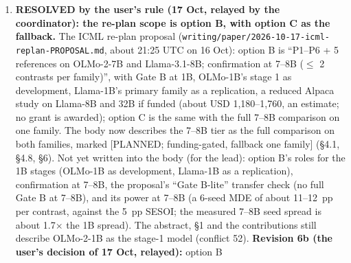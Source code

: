\documentclass{article}
\theoremstyle{plain}
\theoremstyle{definition}
\theoremstyle{remark}
\begin{document}
\begin{enumerate}
        harmful compliance from 22.6\% to 0.9\% in its tests, the sweep's
        reading; not fetched or verified here); (b) Safety at One Shot (Zhang et
        al., 2026a; a single-example patch after fine-tuning; cited in \S{}2 and
        \S{}6 as the bounded D5 item). Decide before stage 1 is frozen whether
        either becomes a reference arm, and how B+Qi relates to an opening hold.
        If (a) is added, its citation must be fetched by the OpenReview API
        first. \textbf{Revision 6b:} the body now lists a lower-learning-rate
        reference, recipe B at the next lower rung, as [PLANNED; to be
        pre-registered] (\S{}4.4; review B W3), and the data-only analogue of
        the one-shot example (the example added to the training data) and Qi et
        al.'s augmentation as candidate data arms [TO BE FIXED in the stage-1
        pre-registration] (\S{}4.3; review B W5; decision 41). The post-hoc
        one-shot patch and the opening-hold loss stay out of the body's
        references.
  \item \textbf{RESOLVED by the user's rule (17 Oct, relayed by the
        coordinator): the re-plan scope is option B, with option C as the
        fallback.} The ICML re-plan proposal
        (\nolinkurl{writing/paper/2026-10-17-icml-replan-PROPOSAL.md}, about
        21:25 UTC on 16 Oct): option B is ``P1--P6 + 5 references on OLMo-2-7B
        and Llama-3.1-8B; confirmation at 7--8B ($\le$ 2 contrasts per
        family)'', with Gate B at 1B, OLMo-1B's stage 1 as development,
        Llama-1B's primary family as a replication, a reduced Alpaca study on
        Llama-8B and 32B if funded (about USD 1,180--1,760, an estimate; no
        grant is awarded); option C is the same with the full 7--8B comparison
        on one family. The body now describes the 7--8B tier as the full
        comparison on both families, marked [PLANNED; funding-gated, fallback
        one family] (\S{}4.1, \S{}4.8, \S{}6). Not yet written into the body
        (for the lead): option B's roles for the 1B stages (OLMo-1B as
        development, Llama-1B as a replication), confirmation at 7--8B, the
        proposal's ``Gate B-lite'' transfer check (no full Gate B at 7--8B), and
        its power at 7--8B (a 6-seed MDE of about 11--12~pp per contrast,
        against the 5~pp SESOI; the measured 7--8B seed spread is about
        1.7$\times$ the 1B spread). The abstract, \S{}1 and the contributions
        still describe OLMo-2-1B as the stage-1 model (conflict 52).
        \textbf{Revision 6b (the user's decision of 17 Oct, relayed):} option B

\end{enumerate}
\end{document}
